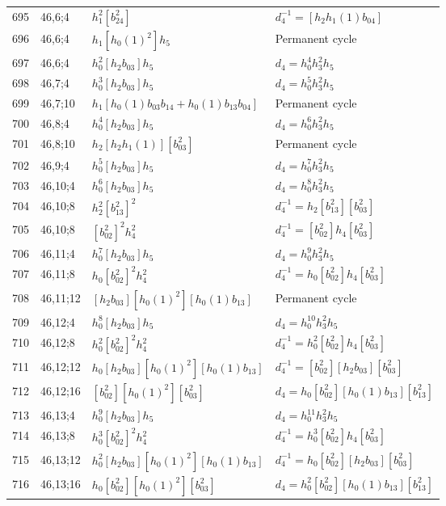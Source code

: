 \documentclass{article}
\begin{document}
\begin{longtable}{|l|l|>{\raggedright\arraybackslash}p{6cm}|>{\raggedright\arraybackslash}p{6cm}|}
\hline
695 & 46,6;4 & $h_1^2[b_{24}^2]$ & $d_{4}^{-1}=[h_2h_1(1)b_{04}]$\\
696 & 46,6;4 & $h_1[h_0(1)^2]h_5$ & Permanent cycle\\
697 & 46,6;4 & $h_0^2[h_2b_{03}]h_5$ &$d_{4}=h_0^4h_3^2h_5$\\
\hline
698 & 46,7;4 & $h_0^3[h_2b_{03}]h_5$ &$d_{4}=h_0^5h_3^2h_5$\\
\hline
699 & 46,7;10 & $h_1[h_0(1)b_{03}b_{14} + h_0(1)b_{13}b_{04}]$ & Permanent cycle\\
\hline
700 & 46,8;4 & $h_0^4[h_2b_{03}]h_5$ &$d_{4}=h_0^6h_3^2h_5$\\
\hline
701 & 46,8;10 & $h_2[h_2h_1(1)][b_{03}^2]$ & Permanent cycle\\
\hline
702 & 46,9;4 & $h_0^5[h_2b_{03}]h_5$ &$d_{4}=h_0^7h_3^2h_5$\\
\hline
703 & 46,10;4 & $h_0^6[h_2b_{03}]h_5$ &$d_{4}=h_0^8h_3^2h_5$\\
\hline
704 & 46,10;8 & $h_2^2[b_{13}^2]^2$ & $d_{4}^{-1}=h_2[b_{13}^2][b_{03}^2]$\\
705 & 46,10;8 & $[b_{02}^2]^2h_4^2$ & $d_{4}^{-1}=[b_{02}^2]h_4[b_{03}^2]$\\
\hline
706 & 46,11;4 & $h_0^7[h_2b_{03}]h_5$ &$d_{4}=h_0^9h_3^2h_5$\\
\hline
707 & 46,11;8 & $h_0[b_{02}^2]^2h_4^2$ & $d_{4}^{-1}=h_0[b_{02}^2]h_4[b_{03}^2]$\\
\hline
708 & 46,11;12 & $[h_2b_{03}][h_0(1)^2][h_0(1)b_{13}]$ & Permanent cycle\\
\hline
709 & 46,12;4 & $h_0^8[h_2b_{03}]h_5$ &$d_{4}=h_0^{10}h_3^2h_5$\\
\hline
710 & 46,12;8 & $h_0^2[b_{02}^2]^2h_4^2$ & $d_{4}^{-1}=h_0^2[b_{02}^2]h_4[b_{03}^2]$\\
\hline
711 & 46,12;12 & $h_0[h_2b_{03}][h_0(1)^2][h_0(1)b_{13}]$ & $d_{4}^{-1}=[b_{02}^2][h_2b_{03}][b_{03}^2]$\\
\hline
712 & 46,12;16 & $[b_{02}^2][h_0(1)^2][b_{03}^2]$ &$d_{4}=h_0[b_{02}^2][h_0(1)b_{13}][b_{13}^2]$\\
\hline
713 & 46,13;4 & $h_0^9[h_2b_{03}]h_5$ &$d_{4}=h_0^{11}h_3^2h_5$\\
\hline
714 & 46,13;8 & $h_0^3[b_{02}^2]^2h_4^2$ & $d_{4}^{-1}=h_0^3[b_{02}^2]h_4[b_{03}^2]$\\
\hline
715 & 46,13;12 & $h_0^2[h_2b_{03}][h_0(1)^2][h_0(1)b_{13}]$ & $d_{4}^{-1}=h_0[b_{02}^2][h_2b_{03}][b_{03}^2]$\\
\hline
716 & 46,13;16 & $h_0[b_{02}^2][h_0(1)^2][b_{03}^2]$ &$d_{4}=h_0^2[b_{02}^2][h_0(1)b_{13}][b_{13}^2]$\\

\end{longtable}
\end{document}
